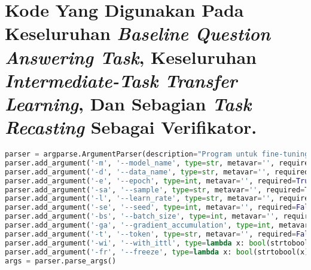 \section*{Kode Yang Digunakan Pada Keseluruhan \emph{Baseline Question Answering Task}, Keseluruhan \emph{Intermediate-Task Transfer Learning}, Dan Sebagian \emph{Task Recasting} Sebagai Verifikator.}

\begin{lstlisting}[language=Python, caption=Pengambilan parameter untuk \emph{training question answering task}]
parser = argparse.ArgumentParser(description="Program untuk fine-tuning dataset QA")
parser.add_argument('-m', '--model_name', type=str, metavar='', required=True, help="Nama model Anda; String; choice=[indolem, indonlu, xlmr, your model choice]")
parser.add_argument('-d', '--data_name', type=str, metavar='', required=True, help="Nama dataset Anda; String; choice=[squadid, idkmrc, tydiqaid]")
parser.add_argument('-e', '--epoch', type=int, metavar='', required=True, help="Jumlah epoch Anda; Integer; choice=[all integer]")
parser.add_argument('-sa', '--sample', type=str, metavar='', required=True, help="Jumlah sampling data Anda; Integer; choice=[max, all integer]")
parser.add_argument('-l', '--learn_rate', type=str, metavar='', required=False, help="Jumlah learning rate Anda; Float; choice=[all float]; default=1e-5", default=1e-5)
parser.add_argument('-se', '--seed', type=int, metavar='', required=False, help="Jumlah seed Anda; Integer; choice=[all integer]; default=42", default=42)
parser.add_argument('-bs', '--batch_size', type=int, metavar='', required=False, help="Jumlah batch-size Anda; Integer; choice=[all integer]; default=16", default=16)
parser.add_argument('-ga', '--gradient_accumulation', type=int, metavar='', required=False, help="Jumlah gradient accumulation Anda; Integer; choice=[all integer]; default=8", default=8)
parser.add_argument('-t', '--token', type=str, metavar='', required=False, help="Token Hugging Face Anda; String; choice=[all string token]; default=(TOKEN_HF_muhammadravi251001)", default="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")
parser.add_argument('-wi', '--with_ittl', type=lambda x: bool(strtobool(x)), metavar='', required=False, help="Dengan ITTL atau tidak?; Boolean; choice=[True, False]; default=False", default=False)
parser.add_argument('-fr', '--freeze', type=lambda x: bool(strtobool(x)), metavar='', required=False, help="Dengan ITTL, apa mau freeze layer BERT?; Boolean; choice=[True, False]; default=False", default=False)
args = parser.parse_args()
\end{lstlisting}

